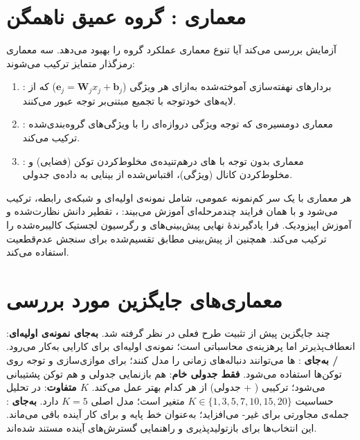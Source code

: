 \section{معماری : گروه عمیق ناهمگن}
\label{sec:v6_architecture}

آزمایش  بررسی می‌کند آیا تنوع معماری عملکرد گروه را بهبود می‌دهد. سه معماری رمزگذار متمایز ترکیب می‌شوند:

\begin{enumerate}
\item \textbf{}: بردارهای نهفته‌سازی آموخته‌شده به‌ازای هر ویژگی ($\mathbf{e}_j = \mathbf{W}_j x_j + \mathbf{b}_j$) که از لایه‌های خودتوجه با تجمیع مبتنی‌بر توجه عبور می‌کنند.
\item \textbf{}: معماری دومسیره‌ی  که توجه ویژگی دروازه‌ای را با  ویژگی‌های گروه‌بندی‌شده ترکیب می‌کند.
\item \textbf{}: معماری بدون توجه با های درهم‌تنیده‌ی مخلوط‌کردن توکن (فضایی) و مخلوط‌کردن کانال (ویژگی)، اقتباس‌شده از بینایی به داده‌ی جدولی.
\end{enumerate}

هر معماری با یک سر کم‌نمونه عمومی، شامل نمونه‌ی اولیه‌ای و شبکه‌ی رابطه، ترکیب می‌شود و با همان فرایند چندمرحله‌ای آموزش می‌بیند: ، تقطیر دانش نظارت‌شده و آموزش اپیزودیک. فرا یادگیرندۀ نهایی پیش‌بینی‌های  و رگرسیون لجستیک کالیبره‌شده را ترکیب می‌کند.  همچنین از پیش‌بینی مطابق تقسیم‌شده برای سنجش عدم‌قطعیت استفاده می‌کند.

\section{معماری‌های جایگزین مورد بررسی}

چند جایگزین پیش از تثبیت طرح فعلی در نظر گرفته شد. \textbf{ به‌جای نمونه‌ی اولیه‌ای}:  انعطاف‌پذیرتر اما پرهزینه‌ی محاسباتی است؛ نمونه‌ی اولیه‌ای برای کارایی به‌کار می‌رود. \textbf{/ به‌جای }: ها می‌توانند دنباله‌های زمانی را مدل کنند؛  برای موازی‌سازی و توجه روی توکن‌ها استفاده می‌شود. \textbf{فقط جدولی خام}: هم بازنمایی جدولی و هم توکن پشتیبانی می‌شود؛ ترکیبی ( + جدولی) از هر کدام بهتر عمل می‌کند. \textbf{$K$ متفاوت}: در تحلیل حساسیت $K \in \{1,3,5,7,10,15,20\}$ متغیر است؛ مدل اصلی $K=5$ دارد. \textbf{ به‌جای }:  جمله‌ی مجاورتی برای غیر- می‌افزاید؛  به‌عنوان خط پایه و  برای کار آینده باقی می‌ماند. این انتخاب‌ها برای بازتولیدپذیری و راهنمایی گسترش‌های آینده مستند شده‌اند.

